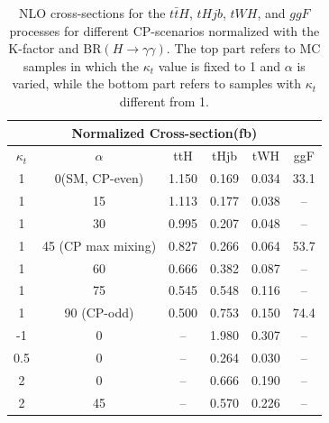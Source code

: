 \begin{table}
  \centering
  \begin{tabular}{|c|c||c|c|c|c|}
    \hline
    \multicolumn{6}{|c|}{Normalized Cross-section(fb)} \\
    \hline \hline
    $\kappa_t$ & $\alpha$ & ttH & tHjb & tWH & ggF\\
    \hline
    1 & 0(SM, CP-even)  & 1.150 & 0.169 & 0.034 & 33.1 \\
    1 & 15              & 1.113 & 0.177 & 0.038 & -- \\
    1 & 30              & 0.995 & 0.207 & 0.048 & -- \\
    1 & 45 (CP max mixing)      & 0.827 & 0.266 & 0.064 & 53.7 \\
    1 & 60              & 0.666 & 0.382 & 0.087 & -- \\
    1 & 75              & 0.545 & 0.548 & 0.116 & -- \\
    1 & 90 (CP-odd)     & 0.500 & 0.753 & 0.150 & 74.4 \\
    \hline \hline
    -1 & 0    & -- & 1.980 & 0.307 & -- \\
    0.5 & 0   & -- & 0.264 & 0.030 & -- \\
    2 & 0     & -- & 0.666 & 0.190 & -- \\
    2 & 45    & -- & 0.570 & 0.226 & -- \\
    \hline
  \end{tabular}
  \caption{NLO cross-sections for the $t\bar{t}H$, $tHjb$, $tWH$, and $ggF$ processes for different CP-scenarios normalized with the K-factor and BR$(H\rightarrow\gamma\gamma)$. The top part refers to MC samples in which the $\kappa_{t}$ value is fixed to 1 and $\alpha$ is varied, while the bottom part refers to samples with $\kappa_{t}$ different from 1.}
  \label{tab:MCsamples_XS_norm}
\end{table}
